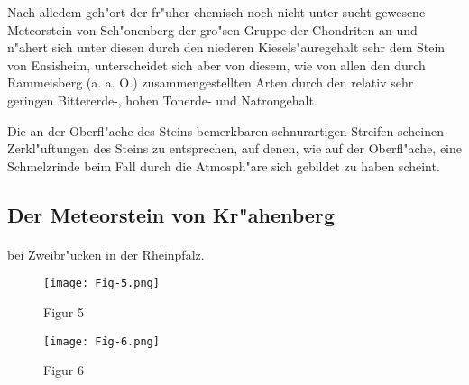 \documentclass[a4paper, 11pt, oneside]{article}
\begin{document}
Nach alledem geh"ort der fr"uher chemisch noch nicht unter sucht gewesene Meteorstein von Sch"onenberg der gro"sen Gruppe der Chondriten an und n"ahert sich unter diesen durch den niederen Kiesels"auregehalt sehr dem Stein von Ensisheim, unterscheidet sich aber von diesem, wie von allen den durch Rammeisberg (a. a. O.) zusammengestellten Arten durch den relativ sehr geringen Bittererde-, hohen Tonerde- und Natrongehalt.

Die an der Oberfl"ache des Steins bemerkbaren schnurartigen Streifen scheinen Zerkl"uftungen des Steins zu entsprechen, auf denen, wie auf der Oberfl"ache, eine Schmelzrinde beim Fall durch die Atmosph"are sich gebildet zu haben scheint.
\clearpage
\subsection{Der Meteorstein von Kr"ahenberg}
\paragraph{}
bei Zweibr"ucken in der Rheinpfalz.
\begin{figure}[h]
\centering
\texttt{[image: Fig-5.png]}
\caption{Figur 5}
\end{figure}
\begin{figure}[h]
\centering
\texttt{[image: Fig-6.png]}
\caption{Figur 6}
\end{figure}
\end{document}

